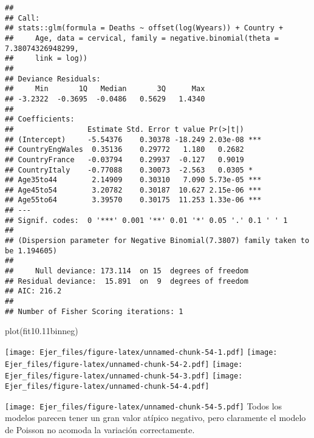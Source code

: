 \documentclass[
]{article}
\newenvironment{Shaded}{\begin{snugshade}}{\end{snugshade}}
\newcommand{\DecValTok}[1]{\textcolor[rgb]{0.00,0.00,0.81}{#1}}
\newcommand{\FloatTok}[1]{\textcolor[rgb]{0.00,0.00,0.81}{#1}}
\newcommand{\FunctionTok}[1]{\textcolor[rgb]{0.00,0.00,0.00}{#1}}
\newcommand{\NormalTok}[1]{#1}
\newcommand{\OtherTok}[1]{\textcolor[rgb]{0.56,0.35,0.01}{#1}}
\newcommand{\SpecialCharTok}[1]{\textcolor[rgb]{0.00,0.00,0.00}{#1}}
\begin{document}
\begin{verbatim}
## 
## Call:
## stats::glm(formula = Deaths ~ offset(log(Wyears)) + Country + 
##     Age, data = cervical, family = negative.binomial(theta = 7.38074326948299, 
##     link = log))
## 
## Deviance Residuals: 
##     Min       1Q   Median       3Q      Max  
## -3.2322  -0.3695  -0.0486   0.5629   1.4340  
## 
## Coefficients:
##                 Estimate Std. Error t value Pr(>|t|)    
## (Intercept)     -5.54376    0.30378 -18.249 2.03e-08 ***
## CountryEngWales  0.35136    0.29772   1.180   0.2682    
## CountryFrance   -0.03794    0.29937  -0.127   0.9019    
## CountryItaly    -0.77088    0.30073  -2.563   0.0305 *  
## Age35to44        2.14909    0.30310   7.090 5.73e-05 ***
## Age45to54        3.20782    0.30187  10.627 2.15e-06 ***
## Age55to64        3.39570    0.30175  11.253 1.33e-06 ***
## ---
## Signif. codes:  0 '***' 0.001 '**' 0.01 '*' 0.05 '.' 0.1 ' ' 1
## 
## (Dispersion parameter for Negative Binomial(7.3807) family taken to be 1.194605)
## 
##     Null deviance: 173.114  on 15  degrees of freedom
## Residual deviance:  15.891  on  9  degrees of freedom
## AIC: 216.2
## 
## Number of Fisher Scoring iterations: 1
\end{verbatim}

\begin{Shaded}
\begin{Highlighting}[]
\FunctionTok{plot}\NormalTok{(fit10}\FloatTok{.11}\NormalTok{binneg)}
\end{Highlighting}
\end{Shaded}

\texttt{[image: Ejer\_files/figure-latex/unnamed-chunk-54-1.pdf]}
\texttt{[image: Ejer\_files/figure-latex/unnamed-chunk-54-2.pdf]}
\texttt{[image: Ejer\_files/figure-latex/unnamed-chunk-54-3.pdf]}
\texttt{[image: Ejer\_files/figure-latex/unnamed-chunk-54-4.pdf]}

\begin{Shaded}
\end{Shaded}

\texttt{[image: Ejer\_files/figure-latex/unnamed-chunk-54-5.pdf]} Todos
los modelos parecen tener un gran valor atípico negativo, pero
claramente el modelo de Poisson no acomoda la variación correctamente.
\end{document}
